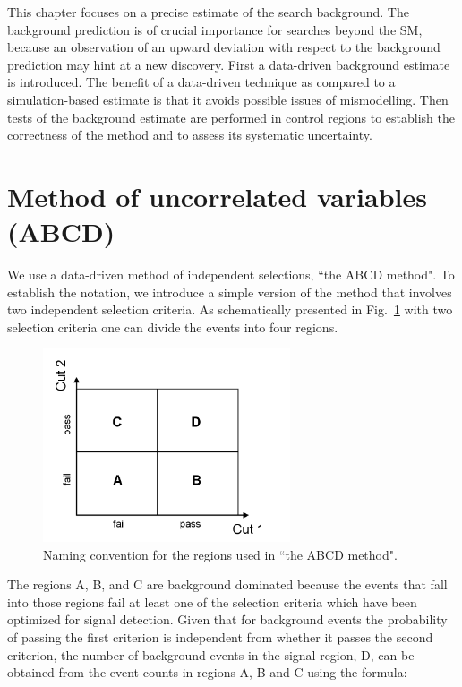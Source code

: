 This chapter focuses on a precise estimate of the search background. The
background prediction is of crucial importance for searches beyond the SM, because an observation
of an upward deviation with respect to the background prediction may hint at a new discovery.
First a data-driven background estimate is introduced. The benefit of a data-driven technique
as compared to a simulation-based estimate is that it avoids possible issues of 
mismodelling. Then tests of the background estimate are performed 
in control regions to establish the correctness of the method and to assess
its systematic uncertainty.


\section{Method of uncorrelated variables (ABCD)}




\label{sec:abcd}
We use a data-driven method of independent selections, ``the ABCD method".
To establish the notation, we introduce a simple version of the method that involves two 
independent selection criteria. As schematically presented in Fig.~\ref{fig:abcd} 
with two selection criteria one can divide the events into four
regions.
\begin{figure}[htbp]
\centering
\includegraphics[width=0.65\textwidth]{plots/abcd.png}
\caption{Naming convention for the regions used in ``the ABCD method".\label{fig:abcd}}
\end{figure}
The regions A, B, and C are background dominated because the events that fall into those regions fail at least 
one of the selection criteria which have been optimized for signal detection. 
Given that for background events the probability of passing the first criterion is independent 
from whether it passes the second criterion, the number
of background events in the signal region, D, can be obtained from the event counts in regions A, B and C using the formula:


